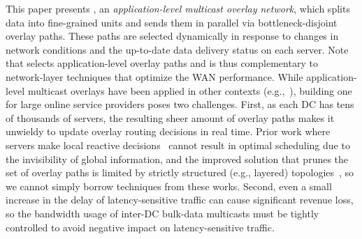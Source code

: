 This paper presents {\em \name}, an {\em application-level
multicast overlay network}, which splits data into fine-grained
units and sends them in parallel via bottleneck-disjoint
overlay paths. These paths are selected dynamically in response to changes in
network conditions and the up-to-date data delivery status on each server.
Note that \name selects application-level overlay paths and is thus
complementary to network-layer techniques that
optimize the WAN performance.
While application-level multicast overlays have been applied
in other contexts
(e.g.,~\cite{Liebeherr2002Application,Wang2007mTreebone,
Andreev2013Designing,Mokhtarian2015Minimum}), building one
for large online service providers poses two
challenges.
First, as each DC has tens of thousands of servers, the
resulting sheer amount of overlay paths makes it
unwieldy to update overlay routing decisions in real time.
Prior work where servers make local reactive decisions~\cite{kostic2003bullet,Repantis2010Scaling,Huang2014A} cannot result in optimal scheduling due to the invisibility of global information, and the improved solution that prunes the set of overlay paths is limited by strictly structured (e.g., layered) topologies~\cite{Nygren2010The}, so we cannot simply borrow techniques from these works.
Second, even a small increase in the delay of latency-sensitive traffic
can cause significant revenue loss, so the bandwidth usage
of inter-DC bulk-data multicasts must be tightly controlled
to avoid negative impact on latency-sensitive
traffic.





